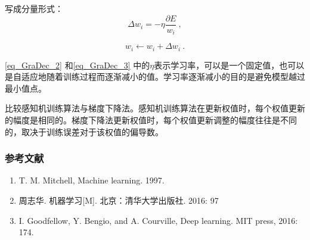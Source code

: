写成分量形式：
\begin{equation}\label{eq_GraDec_3}
\Delta w_i = - \eta \frac{\partial E}{w_i}~,
\end{equation}

\begin{equation}
w_i \leftarrow w_i + \Delta w_i~.
\end{equation}

\autoref{eq_GraDec_2} 和\autoref{eq_GraDec_3} 中的$\eta$表示学习率，可以是一个固定值，也可以是自适应地随着训练过程而逐渐减小的值。学习率逐渐减小的目的是避免模型越过最小值点。

比较感知机训练算法与梯度下降法。感知机训练算法在更新权值时，每个权值更新的幅度是相同的。梯度下降法更新权值时，每个权值更新调整的幅度往往是不同的，取决于训练误差对于该权值的偏导数。




\subsubsection{参考文献}
\begin{enumerate}
\item T. M. Mitchell, Machine learning. 1997.
\item 周志华. 机器学习[M]. 北京：清华大学出版社. 2016: 97
\item I. Goodfellow, Y. Bengio, and A. Courville, Deep learning. MIT press, 2016: 174.
\end{enumerate}